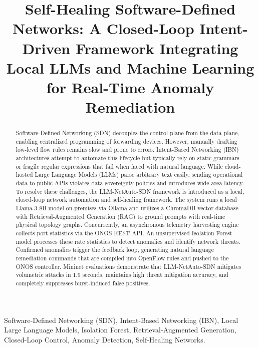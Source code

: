 \documentclass[conference]{IEEEtran}
\begin{document}
\title{Self-Healing Software-Defined Networks: A Closed-Loop Intent-Driven Framework Integrating Local LLMs and Machine Learning for Real-Time Anomaly Remediation}

\author{
}

\maketitle

\begin{abstract}
Software-Defined Networking (SDN) decouples the control plane from the data plane, enabling centralized programming of forwarding devices. However, manually drafting low-level flow rules remains slow and prone to errors. Intent-Based Networking (IBN) architectures attempt to automate this lifecycle but typically rely on static grammars or fragile regular expressions that fail when faced with natural language. While cloud-hosted Large Language Models (LLMs) parse arbitrary text easily, sending operational data to public APIs violates data sovereignty policies and introduces wide-area latency. To resolve these challenges, the LLM-NetAuto-SDN framework is introduced as a local, closed-loop network automation and self-healing framework. The system runs a local Llama-3-8B model on-premises via Ollama and utilizes a ChromaDB vector database with Retrieval-Augmented Generation (RAG) to ground prompts with real-time physical topology graphs. Concurrently, an asynchronous telemetry harvesting engine collects port statistics via the ONOS REST API. An unsupervised Isolation Forest model processes these rate statistics to detect anomalies and identify network threats. Confirmed anomalies trigger the feedback loop, generating natural language remediation commands that are compiled into OpenFlow rules and pushed to the ONOS controller. Mininet evaluations demonstrate that LLM-NetAuto-SDN mitigates volumetric attacks in 1.9 seconds, maintains high threat mitigation accuracy, and completely suppresses burst-induced false positives.
\end{abstract}

\begin{IEEEkeywords}
Software-Defined Networking (SDN), Intent-Based Networking (IBN), Local Large Language Models, Isolation Forest, Retrieval-Augmented Generation, Closed-Loop Control, Anomaly Detection, Self-Healing Networks.
\end{IEEEkeywords}
\end{document}
